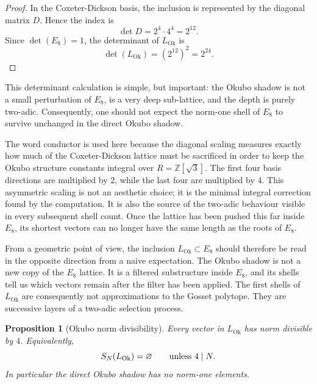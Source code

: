 \documentclass{birkjour}
\newtheorem{proposition}[theorem]{Proposition}
\newcommand{\LOk}{L_{\mathrm{Ok}}}
\newcommand{\ZZ}{\mathbb Z}
\numberwithin{equation}{section}
\begin{document}
\begin{proof}
In the Coxeter-Dickson basis, the inclusion is represented by the diagonal
matrix \(D\). Hence the index is
\begin{equation}
\det D=2^4\cdot 4^4=2^{12}.
\end{equation}
Since \(\det(E_8)=1\), the determinant of \(\LOk\) is
\begin{equation}
\det(\LOk)=(2^{12})^2=2^{24}.
\end{equation}
\end{proof}

This determinant calculation is simple, but important: the
Okubo shadow is not a small perturbation of \(E_8\), is a very deep
sub-lattice, and the depth is purely two-adic. Consequently, one should not
expect the norm-one shell of \(E_8\) to survive unchanged in the direct Okubo
shadow.

The word conductor is used here because the diagonal scaling measures exactly
how much of the Coxeter-Dickson lattice must be sacrificed in order to keep
the Okubo structure constants integral over \(R=\ZZ[\sqrt3]\). The first four
basis directions are multiplied by \(2\), while the last four are multiplied
by \(4\). This asymmetric scaling is not an aesthetic choice; it is the
minimal integral correction found by the computation. It is also the source of
the two-adic behaviour visible in every subsequent shell count. Once the
lattice has been pushed this far inside \(E_8\), its shortest vectors can no
longer have the same length as the roots of \(E_8\).

From a geometric point of view, the inclusion \(\LOk\subset E_8\) should
therefore be read in the opposite direction from a naive expectation. The
Okubo shadow is not a new copy of the \(E_8\) lattice. It is a filtered
substructure inside \(E_8\), and its shells tell us which vectors remain after
the filter has been applied. The first shells of \(\LOk\) are consequently not
approximations to the Gosset polytope. They are successive layers of a
two-adic selection process.

\begin{proposition}[Okubo norm divisibility]
Every vector in \(\LOk\) has norm divisible by \(4\). Equivalently,
\begin{equation}
S_N(\LOk)=\varnothing\qquad\hbox{unless }4\mid N.
\end{equation}
In particular the direct Okubo shadow has no norm-one elements.
\end{proposition}
\end{document}
